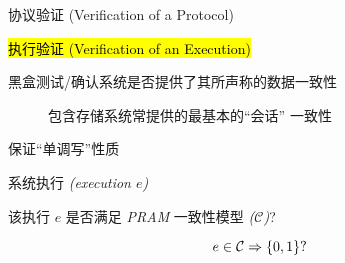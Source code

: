 
\begin{frame}{}
  \begin{center}
    \vspace{0.50cm}
    协议验证 (Verification of a Protocol) \\[5pt]
     

    \vspace{0.30cm}
    \hl{执行验证 (Verification of an Execution)}

    \pause
    \vspace{0.50cm}

    
    \vspace{0.30cm}
    {黑盒测试/确认系统是否提供了其所声称的数据一致性}

     
  \end{center}
\end{frame}

\begin{frame}{}
  \begin{description}
    \item[] 包含存储系统常提供的最基本的``会话''  一致性

	 
  \end{description}

  \vspace{-0.10cm}
  {\centerline{\PRAM{} 保证``单调写''性质}}
\end{frame}

\begin{frame}{}
  \begin{cdef}
    \vspace{8pt}
    \begin{description}
      \setlength{\itemsep}{8pt}
      \item[实例:] 系统执行 \emph{\small (execution $e$)}
      \item[问题:] 该执行 $e$ 是否满足 \emph{PRAM} 一致性模型 \emph{\small ($\mathcal{C}$)}? 
    \end{description}    

    \[
      e \in \mathcal{C} \Rightarrow \{0,1\}?
    \]
  \end{cdef}
\end{frame}

